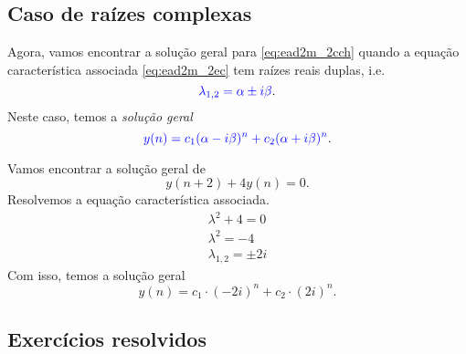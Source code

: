 \subsection{Caso de raízes complexas}

Agora, vamos encontrar a solução geral para \eqref{eq:ead2m_2cch} quando a equação característica associada \eqref{eq:ead2m_2ec} tem raízes reais duplas, i.e.
\begin{equation}
  {\color{blue}\lambda_{1,2} = \alpha \pm i\beta}.
\end{equation}
Neste caso, temos a \emph{solução geral}
\begin{equation}
  {\color{blue}y(n) = c_1(\alpha-i\beta)^n + c_2(\alpha + i\beta)^n}.
\end{equation}

\begin{ex}
  Vamos encontrar a solução geral de
  \begin{equation}
    y(n+2) + 4y(n) = 0.
  \end{equation}
  Resolvemos a equação característica associada.
  \begin{gather}
    \lambda^2 + 4 = 0\\
    \lambda^2 = -4 \\
    \lambda_{1,2} = \pm 2i
  \end{gather}
  Com isso, temos a solução geral
  \begin{equation}
    y(n) = c_1\cdot (-2i)^n + c_2\cdot (2i)^n.
  \end{equation}
\end{ex}

\subsection*{Exercícios resolvidos}

